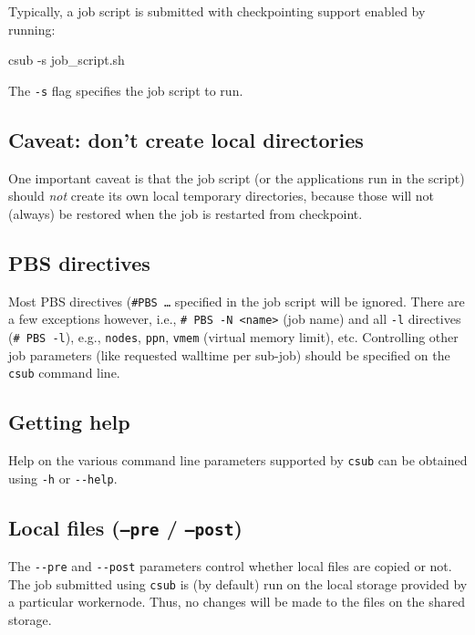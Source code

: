 Typically, a job script is submitted with checkpointing support enabled by running:

\begin{prompt}
csub -s job_script.sh
\end{prompt}

The  \lstinline|-s| flag specifies the job script to run.

\subsection{Caveat: don't create local directories}

One important caveat is that the job script (or the applications run in the script)
should \emph{not} create its own local temporary directories, because those will not (always)
be restored when the job is restarted from checkpoint.

\subsection{PBS directives}

Most PBS directives (\texttt{\#PBS \ldots} specified in the job script will be ignored.
There are a few exceptions however, i.e., \lstinline|# PBS -N <name>| (job name)
and all \lstinline|-l| directives (\lstinline|# PBS -l|), e.g., \lstinline|nodes|,
\lstinline|ppn|, \lstinline|vmem| (virtual memory limit), etc.
Controlling other job parameters (like requested walltime per sub-job) should be
specified on the \lstinline|csub| command line.

\subsection{Getting help}

Help on the various command line parameters supported by \lstinline|csub| can be
obtained using \lstinline|-h| or \lstinline|--help|.

\subsection{Local files (\texttt{--pre} / \texttt{--post})}

The \lstinline|--pre| and \lstinline|--post| parameters control whether local files
are copied or not. The job submitted using \lstinline|csub| is (by default) run on the local
storage provided by a particular workernode. Thus, no changes will be made to the
files on the shared storage.


